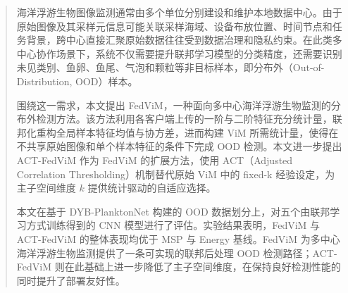 
\begin{abstract}

海洋浮游生物图像监测通常由多个单位分别建设和维护本地数据中心。由于原始图像及其采样元信息可能关联采样海域、设备布放位置、时间节点和任务背景，跨中心直接汇聚原始数据往往受到数据治理和隐私约束。在此类多中心协作场景下，系统不仅需要提升联邦学习模型的分类精度，还需要识别未见类别、鱼卵、鱼尾、气泡和颗粒等非目标样本，即分布外（Out-of-Distribution, OOD）样本。

围绕这一需求，本文提出 FedViM，一种面向多中心海洋浮游生物监测的分布外检测方法。该方法利用各客户端上传的一阶与二阶特征充分统计量，联邦化重构全局样本特征均值与协方差，进而构建 ViM 所需统计量，使得在不共享原始图像和单个样本特征的条件下完成 OOD 检测。本文进一步提出 ACT-FedViM 作为 FedViM 的扩展方法，使用 ACT（Adjusted Correlation Thresholding）机制替代原始 ViM 中的 fixed-k 经验设定，为主子空间维度 $k$ 提供统计驱动的自适应选择。

本文在基于 DYB-PlanktonNet 构建的 OOD 数据划分上，对五个由联邦学习方式训练得到的 CNN 模型进行了评估。实验结果表明，FedViM 与 ACT-FedViM 的整体表现均优于 MSP 与 Energy 基线。FedViM 为多中心海洋浮游生物监测提供了一条可实现的联邦后处理 OOD 检测路径；ACT-FedViM 则在此基础上进一步降低了主子空间维度，在保持良好检测性能的同时提升了部署友好性。

\end{abstract}

